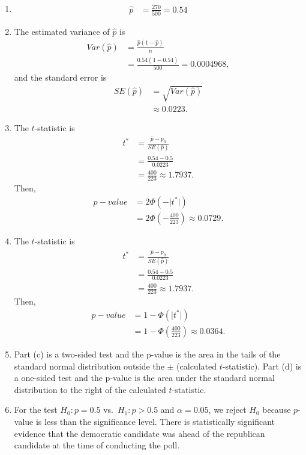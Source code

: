 \documentclass[
]{book}
\begin{document}
\begin{enumerate}
\def\labelenumi{\alph{enumi}.}
\item
  \begin{align}
       \widehat{p}
       & = \frac{270}{500} 
         = 0.54
   \end{align}
\item
  The estimated variance of \(\widehat{p}\) is
  \begin{align}
        Var\left( \widehat{p} \right)
        & = \frac{\widehat{p} \left( 1 -\widehat{p} \right)}{n} \\
        & = \frac{0.54(1-0.54)}{500}  
          = 0.0004968,
    \end{align}
  and the standard error is
  \begin{align}
        SE\left( \widehat{p} \right)
        & = \sqrt{Var\left( \widehat{p} \right)} \\
        & \approx 0.0223.
    \end{align}
\item
  The \(t\)-statistic is
  \begin{align}
        t^* 
        & = \frac{\widehat{p} - p_0}{SE\left( \widehat{p} \right)} \\
        & = \frac{0.54 - 0.5}{0.0223} \\
        & = \frac{400}{223} 
          \approx 1.7937.
    \end{align}
  Then,
  \begin{align}
        p-value
        & = 2\Phi \left( -\lvert{t^*}\lvert \right) \\
        & = 2\Phi \left( -\frac{400}{223} \right) 
          \approx 0.0729.
    \end{align}
\item
  The \(t\)-statistic is
  \begin{align}
        t^* 
        & = \frac{\widehat{p} - p_0}{SE\left( \widehat{p} \right)} \\
        & = \frac{0.54 - 0.5}{0.0223} \\
        & = \frac{400}{223} 
          \approx 1.7937.
    \end{align}
  Then,
  \begin{align}
        p-value
        & = 1 - \Phi \left( \lvert{t^*}\lvert \right) \\
        & = 1 - \Phi \left( \frac{400}{223} \right) 
          \approx 0.0364.
    \end{align}
\item
  Part (c) is a two-sided test and the p-value is the area in the tails of the standard normal distribution outside the \(\pm\) (calculated \(t\)-statistic). Part (d) is a one-sided test
  and the p-value is the area under the standard normal distribution to the right of the calculated \(t\)-statistic.
\item
  For the test \(H_0: p = 0.5\) vs.~\(H_1: p > 0.5\) and \(\alpha = 0.05\), we reject \(H_0\) because \(p\)-value is less than the significance level. There is statistically significant evidence that the democratic candidate was ahead of the republican candidate at the time of conducting the poll.
\end{enumerate}
\end{document}
